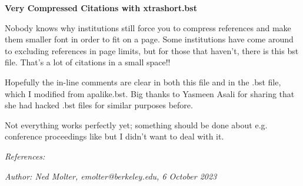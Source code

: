 \documentclass[11pt]{article}
\begin{document}
\begin{center}
	\textbf{Very Compressed Citations with xtrashort.bst}
\end{center}

\justification

Nobody knows why institutions still force you to compress references and make them smaller font in order to fit on a page. Some institutions have come around to excluding references in page limits, but for those that haven't, there is this bst file. That's a lot of citations in a small space!\citep{akins23, allison91, arras21, atreya20, aurnou07, beebe05, brogan18, lellouch07, sherjal95, teca}!

Hopefully the in-line comments are clear in both this file and in the .bst file, which I modified from apalike.bst. Big thanks to Yasmeen Asali for sharing that she had hacked .bst files for similar purposes before.

Not everything works perfectly yet; something should be done about e.g. conference proceedings like \citep{thatte15} but I didn't want to deal with it.



\renewenvironment*{thebibliography}{
   \pointlessenum
   \begin{inparaenum}
   \renewcommand\makelabel[1]{  \textbf{[##1]}}
}{\end{inparaenum}}

\begin{flushleft}
\footnotesize{
\textit{References:}
{} 
}
\end{flushleft}

\vspace{2cm}
\noindent\textit{
Author: Ned Molter, emolter@berkeley.edu, 6 October 2023
}
\end{document}
